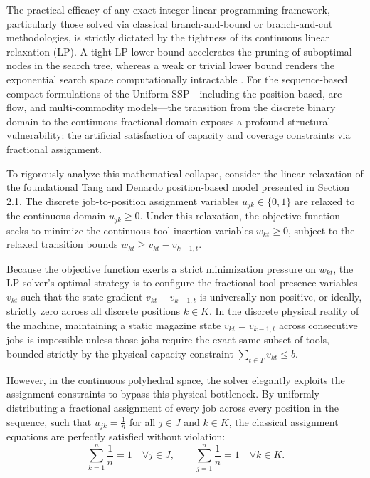 \documentclass[11pt, a4paper]{book}
\begin{document}
	The practical efficacy of any exact integer linear programming framework, particularly those solved via classical branch-and-bound or branch-and-cut methodologies, is strictly dictated by the tightness of its continuous linear relaxation (LP). A tight LP lower bound accelerates the pruning of suboptimal nodes in the search tree, whereas a weak or trivial lower bound renders the exponential search space computationally intractable \cite{Laporte2004, Catanzaro2015}. For the sequence-based compact formulations of the Uniform SSP—including the position-based, arc-flow, and multi-commodity models—the transition from the discrete binary domain to the continuous fractional domain exposes a profound structural vulnerability: the artificial satisfaction of capacity and coverage constraints via fractional assignment.
	
	To rigorously analyze this mathematical collapse, consider the linear relaxation of the foundational Tang and Denardo position-based model presented in Section 2.1. The discrete job-to-position assignment variables $u_{jk} \in \{0,1\}$ are relaxed to the continuous domain $u_{jk} \ge 0$. Under this relaxation, the objective function seeks to minimize the continuous tool insertion variables $w_{kt} \ge 0$, subject to the relaxed transition bounds $w_{kt} \ge v_{kt} - v_{k-1,t}$.
	
	Because the objective function exerts a strict minimization pressure on $w_{kt}$, the LP solver's optimal strategy is to configure the fractional tool presence variables $v_{kt}$ such that the state gradient $v_{kt} - v_{k-1,t}$ is universally non-positive, or ideally, strictly zero across all discrete positions $k \in K$. In the discrete physical reality of the machine, maintaining a static magazine state $v_{kt} = v_{k-1,t}$ across consecutive jobs is impossible unless those jobs require the exact same subset of tools, bounded strictly by the physical capacity constraint $\sum_{t \in T} v_{kt} \le b$.
	
	However, in the continuous polyhedral space, the solver elegantly exploits the assignment constraints to bypass this physical bottleneck. By uniformly distributing a fractional assignment of every job across every position in the sequence, such that $u_{jk} = \frac{1}{n}$ for all $j \in J$ and $k \in K$, the classical assignment equations are perfectly satisfied without violation:
	\begin{equation}
		\sum_{k=1}^{n} \frac{1}{n} = 1 \quad \forall j \in J, \qquad \sum_{j=1}^{n} \frac{1}{n} = 1 \quad \forall k \in K.
	\end{equation}
	
\end{document}
